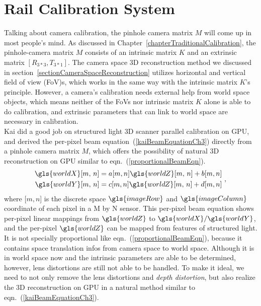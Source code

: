 \section{Rail Calibration System}
\label{sectionRailCalibrationSystem}
Talking about camera calibration, the pinhole camera matrix \(M\) will come up in most people's mind. As discussed in Chapter~\ref{chapterTraditionalCalibration}, the pinhole-camera matrix \(M\) consists of an intrinsic matrix \(K\) and an extrinsic matrix \([R_{3*3}, T_{3*1}]\). The camera space \gls{3D} reconstruction method we discussed in section~\ref{sectionCameraSpaceReconstruction} utilizes horizontal and vertical field of view (\gls{FoV})s, which works in the same way with the intrinsic matrix \(K\)'s principle. However, a camera's calibration needs external help from world space objects, which means neither of the FoVs nor intrinsic matrix \(K\) alone is able to do calibration,  and extrinsic parameters that can link to world space are necessary in calibration. 
\\\indent
Kai \cite{Kai10} did a good job on structured light \gls{3D} scanner parallel calibration on \gls{GPU}, and derived the per-pixel beam equation~(\ref{kaiBeamEquationCh3}) directly from a pinhole camera matrix \(M\), which offers the possibility of natural \gls{3D} reconstruction on \gls{GPU} similar to eqn.~(\ref{proportionalBeamEqn}).
%
\begin{equation}
\begin{aligned}
\gls{worldX}[m,\,  n] = a[m, n]\gls{worldZ}[m,\,  n]+b[m, n]
\\%
\gls{worldY}[m,\,  n] = c[m, n]\gls{worldZ}[m,\,  n]+d[m, n]
\end{aligned} \ ,
\label{kaiBeamEquationCh3}
\end{equation}%
\noindent
where [\(m,n\)] is the discrete space \(\gls{imageRow}\) and \(\gls{imageColumn}\) coordinate of each pixel in a M by N sensor. This per-pixel beam equation shows per-pixel linear mappings from \(\gls{worldZ}\) to \(\gls{worldX}/\gls{worldY}\), and the per-pixel \(\gls{worldZ}\) can be mapped from features of structured light. It is not specially proportional like eqn.~(\ref{proportionalBeamEqn}), because it contains space translation infos from camera space to world space. Although it is in world space now and the intrinsic parameters are able to be determined, however, lens distortions are still not able to be handled. To make it ideal, we need to not only remove the lens distortions and \emph{depth distortion}, but also realize the \gls{3D} reconstruction on \gls{GPU} in a natural method similar to eqn.~(\ref{kaiBeamEquationCh3}).
